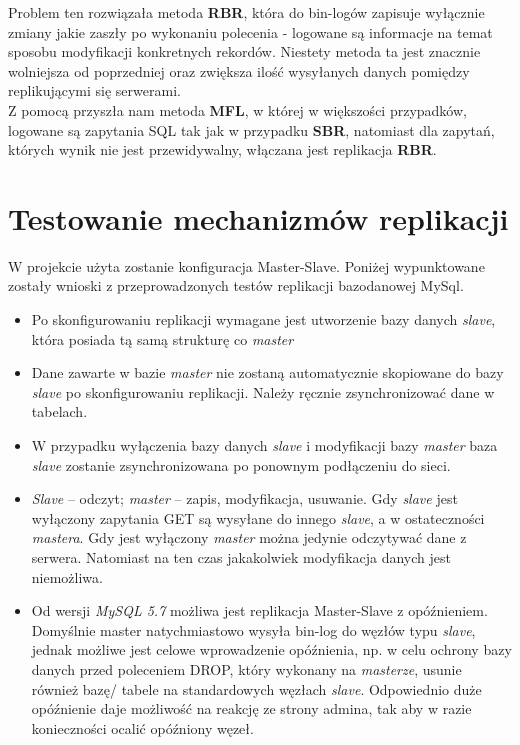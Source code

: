 Problem ten rozwiązała metoda \textbf{RBR}, która do bin-logów zapisuje wyłącznie zmiany jakie zaszły
po wykonaniu polecenia - logowane są informacje na temat sposobu modyfikacji konkretnych
rekordów. Niestety metoda ta jest znacznie wolniejsza od poprzedniej oraz zwiększa ilość
wysyłanych danych pomiędzy replikującymi się serwerami.\\

Z pomocą przyszła nam metoda \textbf{MFL}, w której w większości przypadków, logowane są zapytania
SQL tak jak w przypadku \textbf{SBR}, natomiast dla zapytań, których wynik nie jest przewidywalny,
włączana jest replikacja \textbf{RBR}.\\

\section{Testowanie mechanizmów replikacji}

W projekcie użyta zostanie konfiguracja Master-Slave. Poniżej wypunktowane zostały wnioski z przeprowadzonych testów replikacji bazodanowej MySql.

\begin{itemize}
	\item Po skonfigurowaniu replikacji wymagane jest utworzenie bazy danych \textit{slave}, która posiada
	tą samą strukturę co \textit{master}
	\item Dane zawarte w bazie \textit{master} nie zostaną automatycznie skopiowane do bazy \textit{slave} po
	skonfigurowaniu replikacji. Należy ręcznie zsynchronizować dane w tabelach.
	\item W przypadku wyłączenia bazy danych \textit{slave} i modyfikacji bazy \textit{master} baza \textit{slave} zostanie
	zsynchronizowana po ponownym podłączeniu do sieci.
	\item \textit{Slave} – odczyt; \textit{master} – zapis, modyfikacja, usuwanie. Gdy \textit{slave} jest wyłączony zapytania
	GET są wysyłane do innego \textit{slave}, a w ostateczności \textit{mastera}. Gdy jest wyłączony \textit{master}
	można jedynie odczytywać dane z serwera. Natomiast na ten czas jakakolwiek modyfikacja
	danych jest niemożliwa.
	\item Od wersji\textit{ MySQL 5.7} możliwa jest replikacja Master-Slave z opóźnieniem. Domyślnie master natychmiastowo wysyła bin-log do węzłów typu \textit{slave}, jednak możliwe jest celowe wprowadzenie opóźnienia, np. w celu ochrony bazy danych przed poleceniem DROP, który wykonany na \textit{masterze}, usunie również bazę/ tabele na standardowych węzłach \textit{slave}. Odpowiednio duże opóźnienie daje możliwość na reakcję ze strony admina, tak aby w razie konieczności ocalić opóźniony węzeł.
\end{itemize}



